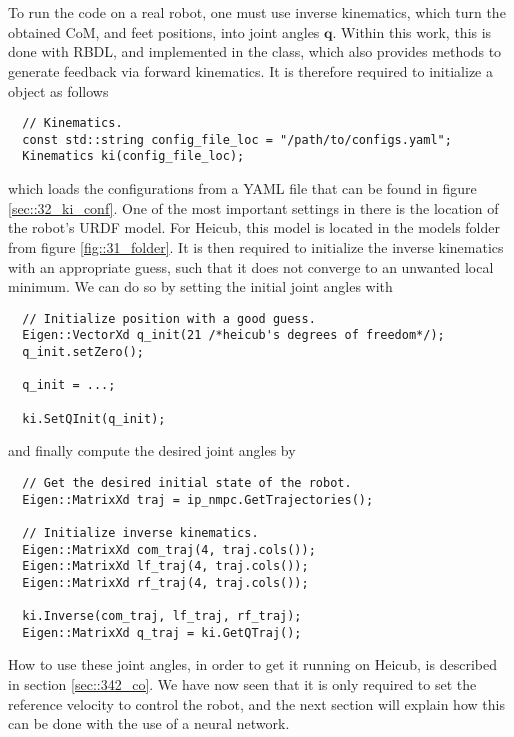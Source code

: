 \\
\\
To run the code on a real robot, one must use inverse kinematics, which turn the obtained CoM, and feet positions, into joint angles $\bm{q}$. Within this work, this is done with RBDL, and implemented in the  class, which also provides methods to generate feedback via forward kinematics. It is therefore required to initialize a  object as follows
\begin{verbatim}
  // Kinematics.
  const std::string config_file_loc = "/path/to/configs.yaml";
  Kinematics ki(config_file_loc);
\end{verbatim}
which loads the configurations from a YAML file that can be found in figure \ref{sec::32_ki_conf}. One of the most important settings in there is the location of the robot's URDF model. For Heicub, this model is located in the models folder from figure \ref{fig::31_folder}.  It is then required to initialize the inverse kinematics with an appropriate guess, such that it does not converge to an unwanted local minimum. We can do so by setting the initial joint angles with
\begin{verbatim}
  // Initialize position with a good guess.
  Eigen::VectorXd q_init(21 /*heicub's degrees of freedom*/);
  q_init.setZero();

  q_init = ...;

  ki.SetQInit(q_init);
\end{verbatim}
and finally compute the desired joint angles by
\begin{verbatim}
  // Get the desired initial state of the robot.
  Eigen::MatrixXd traj = ip_nmpc.GetTrajectories();

  // Initialize inverse kinematics.
  Eigen::MatrixXd com_traj(4, traj.cols());     
  Eigen::MatrixXd lf_traj(4, traj.cols());  
  Eigen::MatrixXd rf_traj(4, traj.cols());

  ki.Inverse(com_traj, lf_traj, rf_traj);
  Eigen::MatrixXd q_traj = ki.GetQTraj();
\end{verbatim}
How to use these joint angles, in order to get it running on Heicub, is described in section \ref{sec::342_co}. We have now seen that it is only required to set the reference velocity to control the robot, and the next section will explain how this can be done with the use of a neural network.
\\
